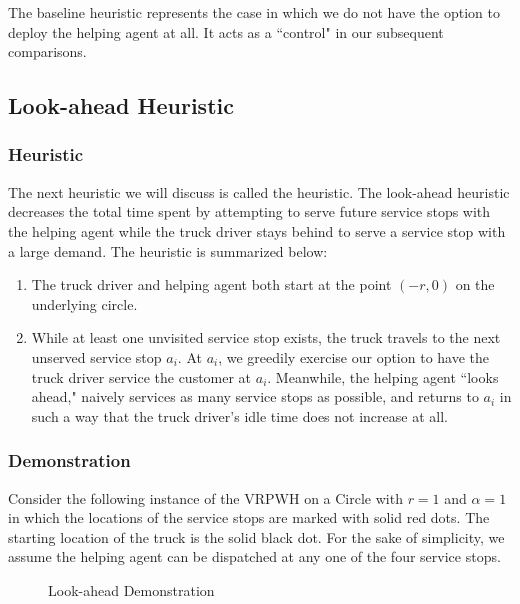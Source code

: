 \documentclass[12pt]{scrartcl}
\begin{document}
The baseline heuristic represents the case in which we do not have the option to deploy the helping agent at all. It acts as a ``control" in our subsequent comparisons.  \\

\subsection{Look-ahead Heuristic}
\subsubsection{Heuristic}
The next heuristic we will discuss is called the  heuristic. The look-ahead heuristic decreases the total time spent by attempting to serve future service stops with the helping agent while the truck driver stays behind to serve a service stop with a large demand. The heuristic is summarized below:

\begin{enumerate}
	\item The truck driver and helping agent both start at the point $(-r, 0)$ on the underlying circle. 
  \item While at least one unvisited service stop exists, the truck travels to the next unserved service stop $a_i$. At $a_i$, we greedily exercise our option to have the truck driver service the customer at $a_i$. Meanwhile, the helping agent ``looks ahead," naively services as many service stops as possible, and returns to $a_i$ in such a way that the truck driver's idle time does not increase at all. 
\end{enumerate}

\subsubsection{Demonstration}
Consider the following instance of the VRPWH on a Circle with $r = 1$ and $\alpha = 1$ in which the locations of the service stops are marked with solid red dots. The starting location of the truck is the solid black dot. For the sake of simplicity, we assume the helping agent can be dispatched at any one of the four service stops. 

\begin{figure}[H]
\centering
{}
\caption{Look-ahead Demonstration}
\end{figure}
\end{document}
